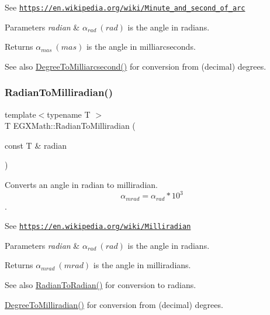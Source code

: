See \href{https://en.wikipedia.org/wiki/Minute_and_second_of_arc}{\tt https\+://en.\+wikipedia.\+org/wiki/\+Minute\+\_\+and\+\_\+second\+\_\+of\+\_\+arc} 
\begin{DoxyParams}{Parameters}
{\em radian} & $\alpha_{rad}\ (rad)$ is the angle in radians. \\
\hline
\end{DoxyParams}
\begin{DoxyReturn}{Returns}
$\alpha_{mas}\ (mas)$ is the angle in milliarcseconds. 
\end{DoxyReturn}
\begin{DoxySeeAlso}{See also}
\mbox{\hyperlink{group___e_g_x_math-_angle_conversions-_degree_ga2c218e286b2ef72a00734dbc5a7f5ab6}{Degree\+To\+Milliarcsecond()}} for conversion from (decimal) degrees. 
\end{DoxySeeAlso}
\mbox{\label{group___e_g_x_math-_angle_conversions-_radian_gaea391f0cca39b05e298dd1cae162e7f1}} 
\subsubsection{\texorpdfstring{Radian\+To\+Milliradian()}{RadianToMilliradian()}}
{\footnotesize\ttfamily template$<$typename T $>$ \\
T E\+G\+X\+Math\+::\+Radian\+To\+Milliradian (\begin{DoxyParamCaption}\item[{const T \&}]{radian }\end{DoxyParamCaption})}



Converts an angle in radian to milliradian. \[\alpha_{mrad}=\alpha_{rad}*10^3\]. 

See \href{https://en.wikipedia.org/wiki/Milliradian}{\tt https\+://en.\+wikipedia.\+org/wiki/\+Milliradian} 
\begin{DoxyParams}{Parameters}
{\em radian} & $\alpha_{rad}\ (rad)$ is the angle in radians. \\
\hline
\end{DoxyParams}
\begin{DoxyReturn}{Returns}
$\alpha_{mrad}\ (mrad)$ is the angle in milliradians. 
\end{DoxyReturn}
\begin{DoxySeeAlso}{See also}
\mbox{\hyperlink{group___e_g_x_math-_angle_conversions-_radian_gae08681bd86b8e7e4325f6c8cb3a0dc37}{Radian\+To\+Radian()}} for conversion to radians. 

\mbox{\hyperlink{group___e_g_x_math-_angle_conversions-_degree_gae4fa6c2d3805430760783650cfbfdb11}{Degree\+To\+Milliradian()}} for conversion from (decimal) degrees. 
\end{DoxySeeAlso}
\mbox{\label{group___e_g_x_math-_angle_conversions-_radian_gae08681bd86b8e7e4325f6c8cb3a0dc37}} 
